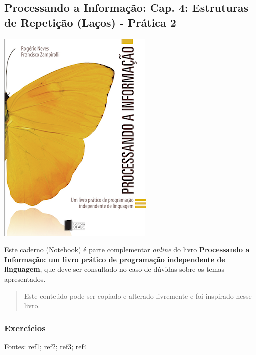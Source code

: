 \documentclass[12pt,a4paper]{article}
\begin{document}
    \hypertarget{processando-a-informauxe7uxe3o-cap.-4-estruturas-de-repetiuxe7uxe3o-lauxe7os---pruxe1tica-2}{%
\subsection{Processando a Informação: Cap. 4: Estruturas de Repetição
(Laços) - Prática
2}\label{processando-a-informauxe7uxe3o-cap.-4-estruturas-de-repetiuxe7uxe3o-lauxe7os---pruxe1tica-2}}

    \includegraphics{"figs/Capa_Processando_Informacao.jpg"}

Este caderno (Notebook) é parte complementar \emph{online} do livro
\textbf{\href{https://editora.ufabc.edu.br/matematica-e-ciencias-da-computacao/58-processando-a-informacao}{Processando
a Informação}: um livro prático de programação independente de
linguagem}, que deve ser consultado no caso de dúvidas sobre os temas
apresentados.

\begin{quote}
Este conteúdo pode ser copiado e alterado livremente e foi inspirado
nesse livro.
\end{quote}

    \hypertarget{exercuxedcios}{%
\subsubsection{Exercícios}\label{exercuxedcios}}

Fontes:
\href{https://docente.ifrn.edu.br/jonathanpereira/disciplinas/algoritmos/lista-de-exercicios-estruturas-de-repeticao-1/view}{ref1};
\href{https://www.inf.pucrs.br/flash/cbp/exwhile.html}{ref2};
\href{https://www.inf.pucrs.br/~pinho/LaproI/Exercicios/Repeticao/Lista1.htm}{ref3};
\href{https://pessoal.dainf.ct.utfpr.edu.br/leoneloalmeida/cursos/if71a-s83-2016-01/algoritmos_3_exerc.pdf}{ref4}
\end{document}
